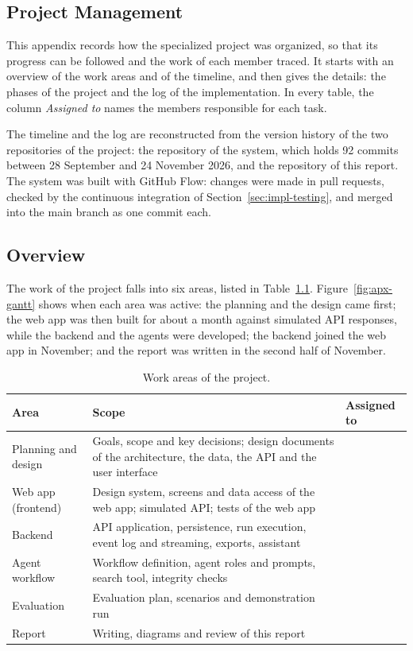 \begin{appendices}
\chapter{Project Management}
\label{apx:project-management}
\label{apx:timeline}
This appendix records how the specialized project was organized, so that its progress can be followed and the work of each member traced. It starts with an overview of the work areas and of the timeline, and then gives the details: the phases of the project and the log of the implementation. In every table, the column \emph{Assigned to} names the members responsible for each task.

The timeline and the log are reconstructed from the version history of the two repositories of the project: the repository of the system, which holds 92 commits between 28 September and 24 November 2026, and the repository of this report. The system was built with GitHub Flow: changes were made in pull requests, checked by the continuous integration of Section~\ref{sec:impl-testing}, and merged into the main branch as one commit each.

\section{Overview}
\label{apx:pm-overview}
The work of the project falls into six areas, listed in Table~\ref{tab:apx-areas}. Figure~\ref{fig:apx-gantt} shows when each area was active: the planning and the design came first; the web app was then built for about a month against simulated API responses, while the backend and the agents were developed; the backend joined the web app in November; and the report was written in the second half of November.

\begin{table}[H]
    \centering
    \caption{Work areas of the project.}
    \label{tab:apx-areas}
    \begin{tabularx}{\linewidth}{|p{3.4cm}|X|p{3cm}|}
        \hline
        \textbf{Area} & \textbf{Scope} & \textbf{Assigned to} \\
        \hline
    Planning and design & Goals, scope and key decisions; design documents of the architecture, the data, the API and the user interface & \\ \hline
    Web app (frontend) & Design system, screens and data access of the web app; simulated API; tests of the web app & \\ \hline
    Backend & API application, persistence, run execution, event log and streaming, exports, assistant & \\ \hline
    Agent workflow & Workflow definition, agent roles and prompts, search tool, integrity checks & \\ \hline
    Evaluation & Evaluation plan, scenarios and demonstration run & \\ \hline
    Report & Writing, diagrams and review of this report & \\ \hline
    \end{tabularx}
\end{table}


\end{appendices}
